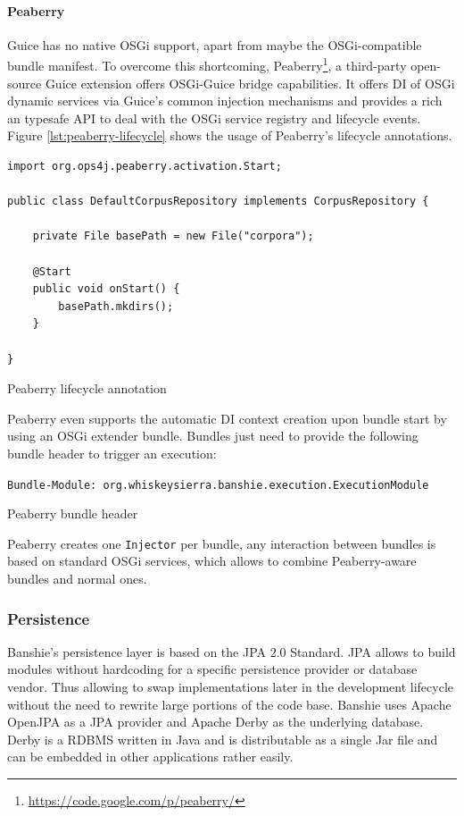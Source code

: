 \paragraph{Peaberry}
Guice has no native OSGi support, apart from maybe the OSGi-compatible bundle manifest. To overcome this shortcoming, Peaberry\footnote{\url{https://code.google.com/p/peaberry/}}, a third-party open-source Guice extension offers OSGi-Guice bridge capabilities. It offers \gls{DI} of OSGi dynamic services via Guice's common injection mechanisms and provides a rich an typesafe API to deal with the OSGi service registry and lifecycle events. Figure \ref{lst:peaberry-lifecycle} shows the usage of Peaberry's lifecycle annotations.

\begin{listing}[H]
\begin{verbatim}
import org.ops4j.peaberry.activation.Start;

public class DefaultCorpusRepository implements CorpusRepository {

    private File basePath = new File("corpora");

    @Start
    public void onStart() {
        basePath.mkdirs();
    }

}
\end{verbatim}
\caption{Peaberry lifecycle annotation}
\label{lst:peaberry-lifecycle}
\end{listing}

Peaberry even supports the automatic \gls{DI} context creation upon bundle start by using an OSGi extender bundle. Bundles just need to provide the following bundle header to trigger an execution:

\begin{listing}[H]
\texttt{Bundle-Module: org.whiskeysierra.banshie.execution.ExecutionModule}
\caption{Peaberry bundle header}
\end{listing}

Peaberry creates one \texttt{Injector} per bundle, any interaction between bundles is based on standard OSGi services, which allows to combine Peaberry-aware bundles and normal ones.

\subsubsection{Persistence}
Banshie's persistence layer is based on the \gls{JPA} 2.0 Standard. \gls{JPA} allows to build modules without hardcoding for a specific persistence provider or database vendor. Thus allowing to swap implementations later in the development lifecycle without the need to rewrite large portions of the code base. Banshie uses Apache OpenJPA as a \gls{JPA} provider and Apache Derby as the underlying database. Derby is a \gls{RDBMS} written in Java and is distributable as a single Jar file and can be embedded in other applications rather easily.

